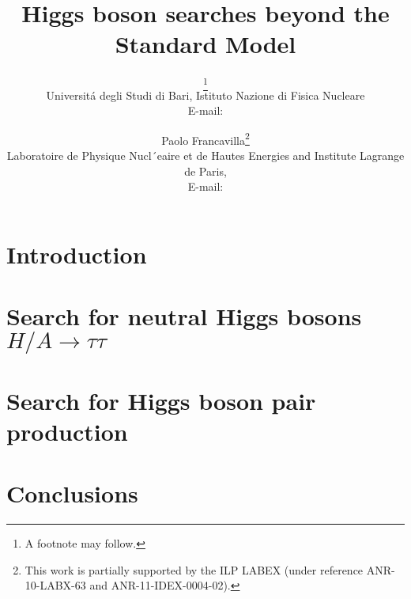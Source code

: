\documentclass{PoS}
\title{Higgs boson searches beyond the Standard Model}
\author{\speaker{Claudio Caputo}\thanks{A footnote may follow.}\\
        Universit\'a degli Studi di Bari, Istituto Nazione di Fisica Nucleare\\
        E-mail: \email{claudio.caputo@cern.ch}}
\author{Paolo Francavilla\thanks{This work is partially supported by the ILP
LABEX (under reference ANR-10-LABX-63 and ANR-11-IDEX-0004-02).}\\
        Laboratoire de Physique Nucl´eaire et de Hautes Energies and Institute Lagrange de Paris,\\
        E-mail: \email{paolo.francavilla@cern.ch}}
\begin{document}
\section{Introduction}


\newpage
\section{Search for neutral  Higgs bosons $H/A \rightarrow \tau\tau$}


\newpage
\section{Search for Higgs boson pair production}


\newpage
\section{Conclusions}


{}

\end{document}
